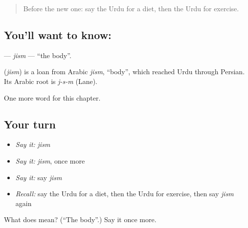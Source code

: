 \begin{quote}
Before the new one: say the Urdu for a diet, then the Urdu for exercise.
\end{quote}

\subsection*{You'll want to know: }
\textbf{} — \emph{jism} — \textquotedblleft{}the body\textquotedblright{}.

\begin{cousinweb}
\textbf{} (\emph{jism}) is a loan from Arabic \emph{jism}, \textquotedblleft{}body\textquotedblright{}, which reached Urdu through Persian. Its Arabic root is \emph{j-s-m} (Lane).
\end{cousinweb}

\begin{grammarlens}[title={What you've built}]
One more word for this chapter.
\end{grammarlens}

\subsection*{Your turn}
\begin{itemize}
\raggedright
  \item \emph{Say it:} \emph{jism}
  \item \emph{Say it:} \emph{jism}, once more
  \item \emph{Say it:} say \emph{jism}
  \item \emph{Recall:} say the Urdu for a diet, then the Urdu for exercise, then say \emph{jism} again
\end{itemize}

\begin{tcolorbox}[breakable,colback=teal!4,colframe=teal!35!black,title={Before you move on}]
What does  mean? (\textquotedblleft{}The body\textquotedblright{}.) Say it once more.
\end{tcolorbox}
